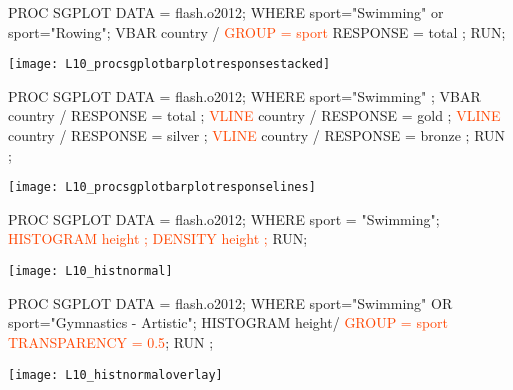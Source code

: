 \begin{frame}[fragile]
\footnotesize
\begin{code}{.0}
PROC SGPLOT DATA = flash.o2012;
	WHERE sport="Swimming" or sport="Rowing";
	VBAR country / \textcolor{OrangeRed}{GROUP = sport} RESPONSE = total ;
RUN;
\end{code}
\emp
\vspace{1ex}
\texttt{[image: L10\_procsgplotbarplotresponsestacked]}
\emp
\end{frame}

\begin{frame}[fragile]
\footnotesize
\begin{code}{.0}
PROC SGPLOT DATA = flash.o2012;
   WHERE sport="Swimming" ;
   VBAR country / RESPONSE = total ;
   \textcolor{OrangeRed}{VLINE} country / RESPONSE = gold ;
   \textcolor{OrangeRed}{VLINE} country / RESPONSE = silver ;
   \textcolor{OrangeRed}{VLINE} country / RESPONSE = bronze ;
RUN ;
\end{code}
\emp
\vspace{1ex}
\texttt{[image: L10\_procsgplotbarplotresponselines]}
\emp
\end{frame}


\begin{frame}[fragile]
\footnotesize
\begin{code}{.0}
PROC SGPLOT DATA = flash.o2012;
   WHERE sport = "Swimming";
   \textcolor{OrangeRed}{HISTOGRAM height ;}
   \textcolor{OrangeRed}{DENSITY height ;}
RUN;
\end{code}
\emp
\vspace{1ex}
\texttt{[image: L10\_histnormal]}
\emp
\end{frame}

\begin{frame}[fragile]
\footnotesize
\begin{code}{.0}
PROC SGPLOT DATA = flash.o2012;
   WHERE sport="Swimming" OR sport="Gymnastics - Artistic";
   HISTOGRAM height/  \textcolor{OrangeRed}{GROUP = sport TRANSPARENCY = 0.5};
RUN ;
\end{code}
\emp
\vspace{1ex}
\texttt{[image: L10\_histnormaloverlay]}
\emp
\end{frame}

